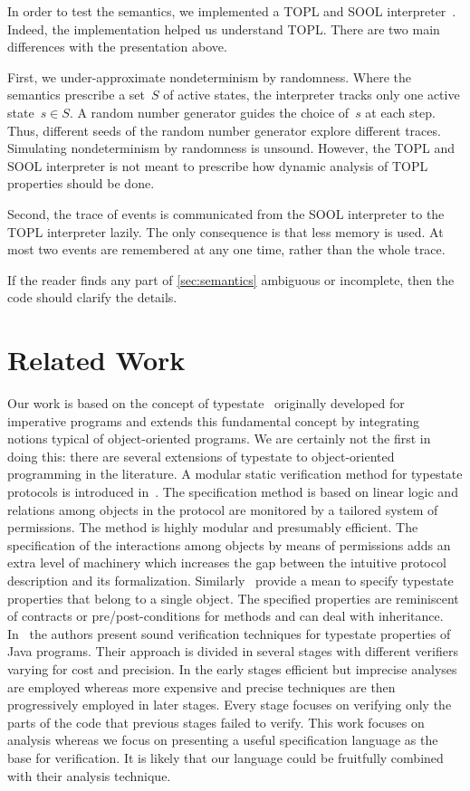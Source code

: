 \documentclass[preprint]{sigplanconf} %
\theoremstyle{definition}
\theoremstyle{remark}
\begin{document}
In order to test the semantics, we implemented a TOPL and SOOL interpreter~\cite{web:topl.prototype}.
Indeed, the implementation helped us understand TOPL\null.
There are two main differences with the presentation above.

First, we under-approximate nondeterminism by randomness.
Where the semantics prescribe a set~$S$ of active states, the interpreter tracks only one active state~$s\in S$.
A random number generator guides the choice of~$s$ at each step.
Thus, different seeds of the random number generator explore different traces.
Simulating nondeterminism by randomness is unsound.
However, the TOPL and SOOL interpreter is not meant to prescribe how dynamic analysis of TOPL properties should be done.

Second, the trace of events is communicated from the SOOL interpreter to the TOPL interpreter lazily.
The only consequence is that less memory is used.
At most two events are remembered at any one time, rather than the whole trace.

If the reader finds any part of \autoref{sec:semantics} ambiguous or incomplete, then the code should clarify the details.

\section{Related Work}\label{sec:related} %
Our work is based on the concept of typestate~\cite{strom1986} originally developed for imperative programs and extends this fundamental concept by integrating notions typical of object-oriented programs. 
We are certainly not the first in doing this: there are several extensions of typestate to object-oriented programming in the literature.
A modular static verification method for typestate protocols is introduced in~\cite{dblp:conf/oopsla/bierhoffa07}. 
The specification method is based on linear logic and relations among objects in the protocol are monitored by a tailored system of permissions. 
The method is highly modular and presumably efficient. The specification of the interactions among objects by means of permissions adds an extra level of machinery which increases the gap between the intuitive protocol description and its formalization. Similarly~\cite{deline2004,dblp:conf/sigsoft/BierhoffA05} provide a mean to specify typestate properties that belong to a single object. The specified properties are reminiscent of contracts or pre/post-conditions for methods and
can deal with inheritance.
In~\cite{dblp:conf/issta/FinkYDRG06} the authors present sound verification techniques for typestate properties of Java  programs.
Their approach is divided in several stages with different verifiers varying for cost and precision.
In the early stages efficient but imprecise analyses are employed whereas
more expensive and precise techniques are then progressively employed in later stages.
Every stage focuses on verifying only the parts of the code that previous stages failed to verify.
This work focuses on analysis whereas we focus on presenting a useful specification language as the base for verification.
It is likely that our language could be fruitfully combined with their analysis technique.
\end{document}
